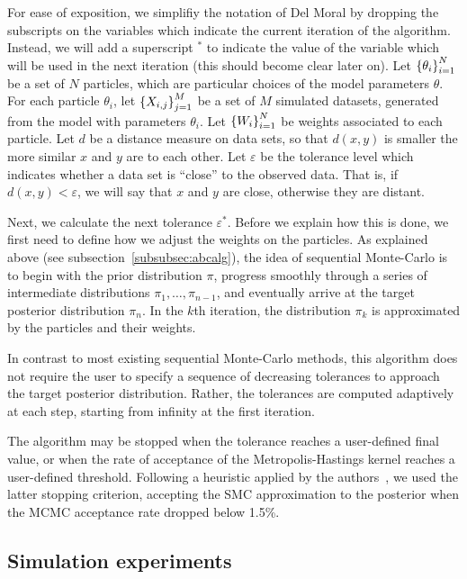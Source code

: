 For ease of exposition, we simplifiy the notation of Del Moral \etal by
dropping the subscripts on the variables which indicate the current iteration
of the algorithm. Instead, we will add a superscript $^*$ to indicate the value
of the variable which will be used in the next iteration (this should become
clear later on). Let $\left\lbrace\theta_i\right\rbrace_{i=1}^{N}$ be a set of $N$ particles,
which are particular choices of the model parameters $\theta$. For each
particle $\theta_i$, let $\left\lbrace X_{i,j}\right\rbrace_{j=1}^M$ be a set of $M$ simulated
datasets, generated from the model with parameters $\theta_i$. Let
$\left\lbrace W_i\right\rbrace_{i=1}^N$ be weights associated to each particle. Let $d$ be a
distance measure on data sets, so that $d(x, y)$ is smaller the more similar
$x$ and $y$ are to each other. Let $\varepsilon$ be the tolerance level which
indicates whether a data set is ``close'' to the observed data. That is, if
$d(x, y) < \varepsilon$, we will say that $x$ and $y$ are close, otherwise they
are distant.


Next, we calculate the next tolerance $\varepsilon^*$. Before we explain how
this is done, we first need to define how we adjust the weights on the
particles. As explained above (see subsection~\ref{subsubsec:abcalg}), the idea
of sequential Monte-Carlo is to begin with the prior distribution $\pi$,
progress smoothly through a series of intermediate distributions $\pi_1,
\ldots, \pi_{n-1}$, and eventually arrive at the target posterior distribution
$\pi_n$. In the $k$th iteration, the distribution $\pi_k$ is approximated by
the particles and their weights. 

In contrast to most existing sequential Monte-Carlo methods, this
algorithm does not require the user to specify a sequence of decreasing
tolerances to approach the target posterior distribution. Rather, the
tolerances are computed adaptively at each step, starting from infinity at the
first iteration. 

The algorithm may be stopped when the tolerance reaches a
user-defined final value, or when the rate of acceptance of the
Metropolis-Hastings kernel reaches a user-defined threshold. Following a
heuristic applied by the authors~\autocite{del2012adaptive}, we used the latter
stopping criterion, accepting the SMC approximation to the posterior when the
\gls{MCMC} acceptance rate dropped below 1.5\%.

\subsection{Simulation experiments}

